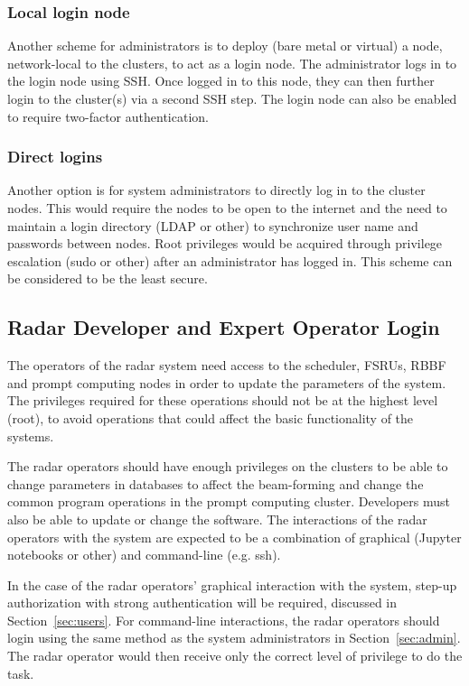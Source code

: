\documentclass[12pt,a4paper]{article}
\begin{document}
\subsubsection{Local login node}
\label{ssec:local-login-node}

Another scheme for administrators is to deploy (bare metal or virtual) a node, network-local to the \ED clusters, to act as a login node.
The administrator logs in to the login node using SSH.
Once logged in to this node, they can then further login to the cluster(s) via a second SSH step.
The login node can also be enabled to require two-factor authentication.

\subsubsection{Direct logins}
\label{ssec:direct}
Another option is for system administrators to directly log in to the cluster nodes.
This would require the nodes to be open to the internet and the need to maintain a login directory (LDAP or other) to synchronize user name and passwords between nodes.
Root privileges would be acquired through privilege escalation (sudo or other) after an administrator has logged in.
This scheme can be considered to be the least secure.

\subsection{Radar Developer and Expert Operator Login}
\label{sec:operator}
The operators of the radar system need access to the scheduler, FSRUs, RBBF and prompt computing nodes in order to update the parameters of the system.  The privileges required for these operations should not be at the highest level (root), to avoid operations that could affect the basic functionality of the systems.

The radar operators should have enough privileges on the clusters to be able to change parameters in databases to affect the beam-forming and change the common program operations in the prompt computing cluster.
Developers must also be able to update or change the software.
The interactions of the radar operators  with the system are expected to be a combination of graphical (Jupyter notebooks or other) and command-line (e.g. ssh).

In the case of the radar operators' graphical interaction with the system, step-up authorization with strong authentication will be required, discussed in Section~\ref{sec:users}.
For command-line interactions, the radar operators should login using the same method as the system administrators in Section~\ref{sec:admin}.
The radar operator would then receive only the correct level of privilege to do the task.
\end{document}
